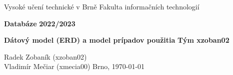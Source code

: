 \documentclass[12pt,a4paper]{article}
\begin{document}
    \pagestyle{empty}
    \begin{titlepage}
        \begin{center}
            \normalsize{Vysoké učení technické v Brně\linebreak}
            \normalsize{Fakulta informačních technologií}

            \vfill

            \large\textbf{Databáze\linebreak}
            \large\textbf{2022/2023}

            \vfill

            \LARGE\textbf{Dátový model (ERD) a model prípadov použitia\linebreak}
            \large\textbf{Tým xzoban02}

            \vfill
            \vfill
            \vfill


            \begin{flushleft}
                \large
                Radek Zobaník (xzoban02)\\
                Vladimír Mečiar (xmecia00)
                \hfill
                Brno, \today
            \end{flushleft}
        \end{center}
    \end{titlepage}
    \pagestyle{plain}
    \newpage

    
    
    
\end{document}
